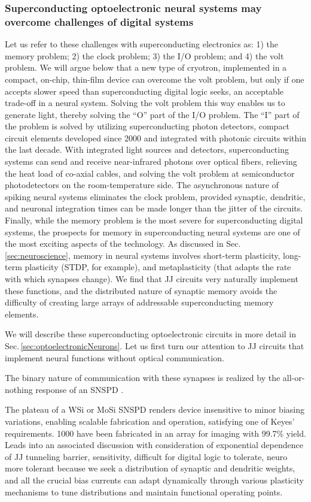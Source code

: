  

\subsubsection{Superconducting optoelectronic neural systems may overcome challenges of digital systems}
Let us refer to these challenges with superconducting electronics as: 1) the memory problem; 2) the clock problem; 3) the I/O problem; and 4) the volt problem. We will argue below that a new type of cryotron, implemented in a compact, on-chip, thin-film device can overcome the volt problem, but only if one accepts slower speed than superconducting digital logic seeks, an acceptable trade-off in a neural system. Solving the volt problem this way enables us to generate light, thereby solving the ``O'' part of the I/O problem. The ``I'' part of the problem is solved by utilizing superconducting photon detectors, compact circuit elements developed since 2000 and integrated with photonic circuits within the last decade. With integrated light sources and detectors, superconducting systems can send and receive near-infrared photons over optical fibers, relieving the heat load of co-axial cables, and solving the volt problem at semiconductor photodetectors on the room-temperature side. The asynchronous nature of spiking neural systems eliminates the clock problem, provided synaptic, dendritic, and neuronal integration times can be made longer than the jitter of the circuits. Finally, while the memory problem is the most severe for superconducting digital systems, the prospects for memory in superconducting neural systems are one of the most exciting aspects of the technology. As discussed in Sec.\,\ref{sec:neuroscience}, memory in neural systems involves short-term plasticity, long-term plasticity (STDP, for example), and metaplasticity (that adapts the rate with which synapses change). We find that JJ circuits very naturally implement these functions, and the distributed nature of synaptic memory avoids the difficulty of creating large arrays of addressable superconducting memory elements. 

We will describe these superconducting optoelectronic circuits in more detail in Sec.\,\ref{sec:optoelectronicNeurons}. Let us first turn our attention to JJ circuits that implement neural functions without optical communication.

\vspace{3em}
The binary nature of communication with these synapses is realized by the all-or-nothing response of an SNSPD \cite{thatpapersomeonepresentedatgroupmeeting}.

\vspace{3em}
The plateau of a WSi or MoSi SNSPD renders device insensitive to minor biasing variations, enabling scalable fabrication and operation, satisfying one of Keyes' requirements. 1000 have been fabricated in an array for imaging with 99.7\% yield. Leads into an associated discussion with consideration of exponential dependence of JJ tunneling barrier, sensitivity, difficult for digital logic to tolerate, neuro more tolerant because we seek a distribution of synaptic and dendritic weights, and all the crucial bias currents can adapt dynamically through various plasticity mechanisms to tune distributions and maintain functional operating points.